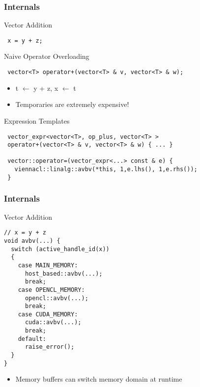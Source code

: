 


\begin{frame}[fragile]
\frametitle{Internals}

 \begin{block}{Vector Addition}
  \begin{lstlisting}
 x = y + z;
  \end{lstlisting}
 \end{block}


 \begin{block}{Naive Operator Overloading}
  \begin{lstlisting}
 vector<T> operator+(vector<T> & v, vector<T> & w);
  \end{lstlisting}


  \begin{itemize}
   \item t $\leftarrow$ y + z, x $\leftarrow$ t
   \item Temporaries are extremely expensive! 
  \end{itemize}
 \end{block}


 \begin{block}{Expression Templates}
  \begin{lstlisting}
 vector_expr<vector<T>, op_plus, vector<T> >
 operator+(vector<T> & v, vector<T> & w) { ... }

 vector::operator=(vector_expr<...> const & e) {
   viennacl::linalg::avbv(*this, 1,e.lhs(), 1,e.rhs());
 }
  \end{lstlisting}
  \vspace*{0.5cm}

 \end{block}

\end{frame}



\begin{frame}[fragile]
\frametitle{Internals}

 \begin{block}{Vector Addition}
  \begin{lstlisting}
// x = y + z
void avbv(...) {
  switch (active_handle_id(x))
  {
    case MAIN_MEMORY:
      host_based::avbv(...);
      break;
    case OPENCL_MEMORY:
      opencl::avbv(...);
      break;
    case CUDA_MEMORY:
      cuda::avbv(...);
      break;
    default: 
      raise_error();
  }
}
\end{lstlisting}
  \begin{itemize}
   \item Memory buffers can switch memory domain at runtime
  \end{itemize}
  \vspace*{0.92cm}

 \end{block}

\end{frame}

